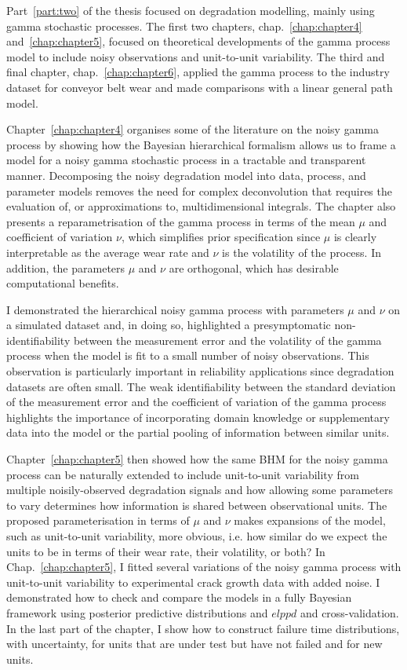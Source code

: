 Part~\ref{part:two} of the thesis focused on degradation modelling, mainly using gamma stochastic processes. The first two chapters, chap.~\ref{chap:chapter4} and~\ref{chap:chapter5}, focused on theoretical developments of the gamma process model to include noisy observations and unit-to-unit variability. The third and final chapter, chap.~\ref{chap:chapter6}, applied the gamma process to the industry dataset for conveyor belt wear and made comparisons with a linear general path model.

Chapter~\ref{chap:chapter4} organises some of the literature on the noisy gamma process by showing how the Bayesian hierarchical formalism allows us to frame a model for a noisy gamma stochastic process in a tractable and transparent manner. Decomposing the noisy degradation model into data, process, and parameter models removes the need for complex deconvolution that requires the evaluation of, or approximations to, multidimensional integrals. The chapter also presents a reparametrisation of the gamma process in terms of the mean $\mu$ and coefficient of variation $\nu$, which simplifies prior specification since $\mu$ is clearly interpretable as the average wear rate and $\nu$ is the volatility of the process. In addition, the parameters $\mu$ and $\nu$ are orthogonal, which has desirable computational benefits.

I demonstrated the hierarchical noisy gamma process with parameters $\mu$ and $\nu$ on a simulated dataset and, in doing so, highlighted a presymptomatic non-identifiability between the measurement error and the volatility of the gamma process when the model is fit to a small number of noisy observations. This observation is particularly important in reliability applications since degradation datasets are often small. The weak identifiability between the standard deviation of the measurement error and the coefficient of variation of the gamma process highlights the importance of incorporating domain knowledge or supplementary data into the model or the partial pooling of information between similar units.

Chapter~\ref{chap:chapter5} then showed how the same BHM for the noisy gamma process can be naturally extended to include unit-to-unit variability from multiple noisily-observed degradation signals and how allowing some parameters to vary determines how information is shared between observational units. The proposed parameterisation in terms of $\mu$ and $\nu$ makes expansions of the model, such as unit-to-unit variability, more obvious, i.e. how similar do we expect the units to be in terms of their wear rate, their volatility, or both? In Chap.~\ref{chap:chapter5}, I fitted several variations of the noisy gamma process with unit-to-unit variability to experimental crack growth data with added noise. I demonstrated how to check and compare the models in a fully Bayesian framework using posterior predictive distributions and $elppd$ and cross-validation. In the last part of the chapter, I show how to construct failure time distributions, with uncertainty, for units that are under test but have not failed and for new units.

